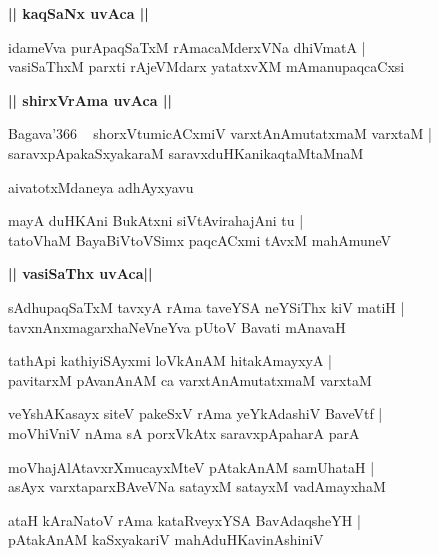 \documentclass[twoside,12pt,openright]{book}
\newcounter{shloka}[chapter]
\def\uvaca#1{\centerline{{\large\textbf{#1}}}}
\begin{document}
\uvaca{|| kaqSaNx uvAca ||}

\begin{shloka}%
idameVva purApaqSaTxM rAmacaMderxVNa dhiVmatA |\\
vasiSaThxM parxti rAjeVMdarx yatatxvXM mAmanupaqcaCxsi 
\end{shloka}

\uvaca{|| shirxVrAma uvAca ||}

\begin{shloka}%
Bagava\char'366 ~ shorxVtumicACxmiV varxtAnAmutatxmaM varxtaM |\\
saravxpApakaSxyakaraM saravxduHKanikaqtaMtaMnaM 
\end{shloka}

\begin{center}
aivatotxMdaneya adhAyxyavu
\end{center}

\begin{shloka}%
mayA duHKAni BukAtxni siVtAvirahajAni tu |\\
tatoVhaM BayaBiVtoVSimx paqcACxmi tAvxM mahAmuneV 
\end{shloka}

\uvaca{|| vasiSaThx uvAca||}

\begin{shloka}%
sAdhupaqSaTxM tavxyA rAma taveYSA neYSiThx kiV matiH |\\
tavxnAnxmagarxhaNeVneYva pUtoV Bavati mAnavaH 
\end{shloka}

\begin{shloka}%
tathApi kathiyiSAyxmi loVkAnAM hitakAmayxyA |\\
pavitarxM pAvanAnAM ca varxtAnAmutatxmaM varxtaM 
\end{shloka}

\begin{shloka}%
veYshAKasayx siteV pakeSxV rAma yeYkAdashiV BaveVtf |\\
moVhiVniV nAma sA porxVkAtx saravxpApaharA parA 
\end{shloka}

\begin{shloka}%
moVhajAlAtavxrXmucayxMteV pAtakAnAM samUhataH |\\
asAyx varxtaparxBAveVNa satayxM satayxM vadAmayxhaM
\end{shloka}

\begin{shloka}%
ataH kAraNatoV rAma kataRveyxYSA BavAdaqsheYH |\\
pAtakAnAM kaSxyakariV mahAduHKavinAshiniV 
\end{shloka}
\end{document}
